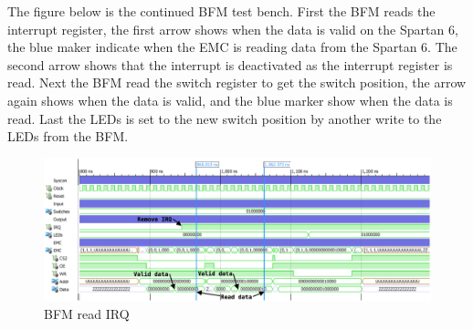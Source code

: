 The figure below is the continued BFM test bench. First the BFM reads the interrupt register, the first arrow shows when the data is valid on the Spartan 6, the blue maker indicate when the EMC is reading data from the Spartan 6. The second arrow shows that the interrupt is deactivated as the interrupt register is read. Next the BFM read the switch register to get the switch position, the arrow again shows when the data is valid, and the blue marker show when the data is read. Last the LEDs is set to the new switch position by another write to the LEDs from the BFM.
\begin{figure}[H]
	\begin{centering}
		\includegraphics[width=1.0\textwidth]{images/tb7_BFM_read_irq.eps}
		\caption{BFM read IRQ}
	\end{centering}
\end{figure}
